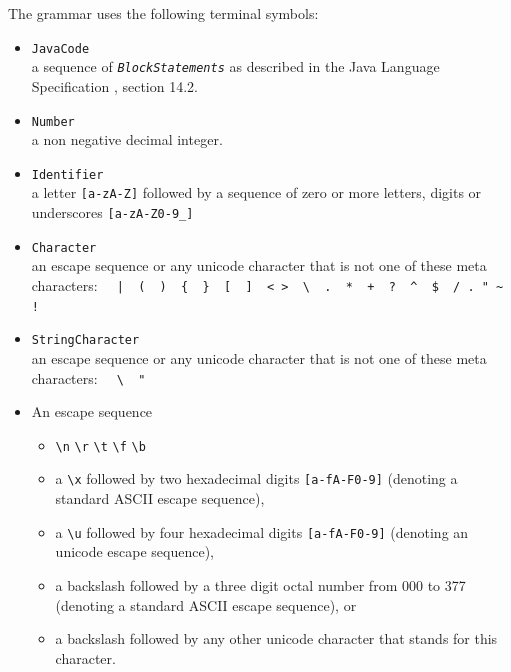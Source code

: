 \documentclass[11pt]{scrartcl}
\newcommand{\trit}{\em}
\begin{document}
\label{Terminals}
The grammar uses the following terminal symbols:   
\begin{itemize}
\item \texttt{JavaCode}\\
  a sequence of {\trit \texttt{BlockStatements}} as described in the Java
  Language Specification \cite{LangSpec}, section 14.2.

\item \texttt{Number}\\
  a non negative decimal integer.
  
\item \texttt{Identifier}\\
  a letter \verb+[a-zA-Z]+ followed by a sequence of zero or more
  letters, digits or underscores \verb+[a-zA-Z0-9_]+

\item \texttt{Character}\\
  an escape sequence or any unicode character that is not one of these
  meta characters:
  \verb:  |  (  )  {  }  [  ]  < >  \  .  *  +  ?  ^  $  / . " ~ !:

\item \texttt{StringCharacter}\\   
  an escape sequence or any unicode character that is not one of these
  meta characters:
  \verb:  \  ":

\item
  An escape sequence

  \begin{itemize}
  \item
    \verb+\n+  \verb+\r+  \verb+\t+  \verb+\f+  \verb+\b+
  \item
    a \verb+\x+ followed by two hexadecimal digits \texttt{[a-fA-F0-9]} (denoting
    a standard ASCII escape sequence),
    
  \item
    a \verb+\u+ followed by four hexadecimal digits \texttt{[a-fA-F0-9]}
    (denoting an unicode escape sequence),

  \item
    a backslash followed by a three digit octal number from 000 to 377 (denoting
    a standard ASCII escape sequence), or

  \item
    a backslash followed by any other unicode character that stands for this
    character.

  \end{itemize}
  
\end{itemize}
\end{document}
